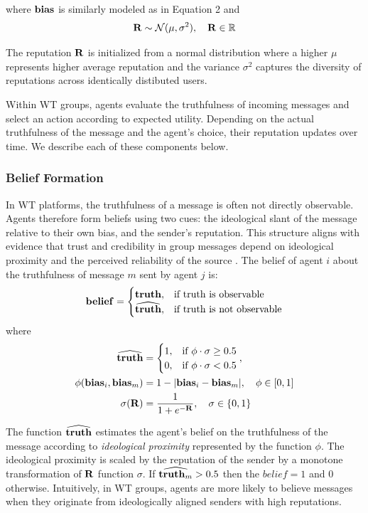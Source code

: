 where $\mathbf{bias}$ is similarly modeled as in Equation 2 and 
\begin{equation}
 \mathbf{R} \sim \mathcal{N}(\mu, \sigma^2), \quad \mathbf{R} \in \mathbb{R}
\end{equation}

The reputation $\mathbf{R}$ is initialized from a normal distribution where a higher $\mu$ represents higher average reputation and the variance $\sigma^2$ captures the diversity of reputations across identically distibuted users.

Within WT groups, agents evaluate the truthfulness of incoming messages and select an action according to expected utility. Depending on the actual truthfulness of the message and the 
agent’s choice, their reputation updates over time. We describe each of these components below.

\subsubsection{Belief Formation}
In WT platforms, the truthfulness of a message is often not directly observable. Agents therefore 
form beliefs using two cues: the ideological slant of the message relative to their own bias, and 
the sender’s reputation. This structure aligns with evidence that trust and credibility in group 
messages depend on ideological proximity and the perceived reliability of the source 
\citep{talwar2020fake, vellani2024motives}. The belief of agent $i$ about the truthfulness of 
message $m$ sent by agent $j$ is:
\begin{equation}
\mathbf{belief} =
    \begin{cases}
    \mathbf{truth}, & \text{if truth is observable} \\
    \widehat{\mathbf{truth}}, & \text{if truth is not observable}
    \end{cases}
\end{equation}
where
\begin{align}
\widehat{\mathbf{truth}} &=
    \begin{cases}
        1, & \text{if } \phi \cdot \sigma \geq 0.5 \\
        0, & \text{if } \phi \cdot \sigma < 0.5
    \end{cases}, \\
\phi(\mathbf{bias}_i, \mathbf{bias}_m) &= 1 - |\mathbf{bias}_i - \mathbf{bias}_m|, \quad \phi \in [0,1] \\
\sigma(\mathbf{R}) &= \frac{1}{1 + e^{-\mathbf{R}}}, \quad \sigma \in \{0,1\}
\end{align}

The function $\widehat{\mathbf{truth}}$ estimates the agent's belief on the truthfulness of the message according to \textit{ideological proximity} represented by the function $\phi$. The ideological proximity is scaled by the reputation of the sender by a monotone transformation of $\mathbf{R}$ function $\sigma$. If $\widehat{\mathbf{truth}_m} > 0.5$ then the $belief = 1$ and 0 otherwise.
Intuitively, in WT groups, agents are more likely to believe messages when they originate from ideologically aligned senders with high reputations.

